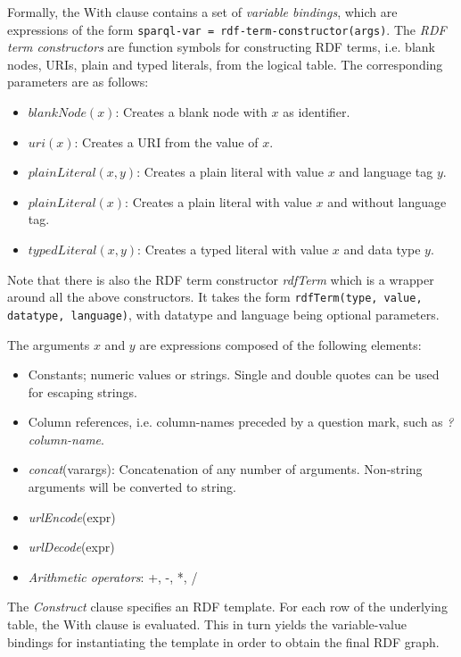 \documentclass[a4paper,twoside,bibtotoc,abstracton,12pt,BCOR=15mm]{scrreprt}
\begin{document}
Formally, the With clause contains a set of \emph{variable bindings}, which are expressions of the form \texttt{sparql-var = rdf-term-constructor(args)}.
The \emph{RDF term constructors} are function symbols for constructing RDF terms, i.e. blank nodes, URIs, plain and typed literals, from the logical table.
The corresponding parameters are as follows:
\begin{itemize}
  \item $blankNode(x)$: Creates a blank node with $x$ as identifier.
  \item $uri(x)$:  Creates a URI from the value of $x$.
  \item $plainLiteral(x, y)$: Creates a plain literal with value $x$ and language tag $y$.
  \item $plainLiteral(x)$: Creates a plain literal with value $x$ and without language tag.
  \item $typedLiteral(x, y)$: Creates a typed literal with value $x$ and data type $y$. 
\end{itemize}
Note that there is also the RDF term constructor \emph{rdfTerm} which is a wrapper around all the above constructors.
It takes the form \texttt{rdfTerm(type, value, datatype, language)}, with datatype and language being optional parameters.

The arguments $x$ and $y$ are expressions composed of the following elements:
\begin{itemize}
           \item Constants; numeric values or strings.
           		Single and double quotes can be used for escaping strings. 
           \item Column references, i.e. column-names preceded by a question mark, such as \emph{?column-name}.
           \item \emph{concat}(varargs): Concatenation of any number of arguments. Non-string arguments will be converted to string.
           \item \emph{urlEncode}(expr)
           \item \emph{urlDecode}(expr)
           \item \emph{Arithmetic operators}: +, -, *, /
\end{itemize}
           
The \emph{Construct} clause specifies an RDF template. 
For each row of the underlying table, the With clause is evaluated.
This in turn yields the variable-value bindings for instantiating the template in order to obtain the final RDF graph.
  
\end{document}
